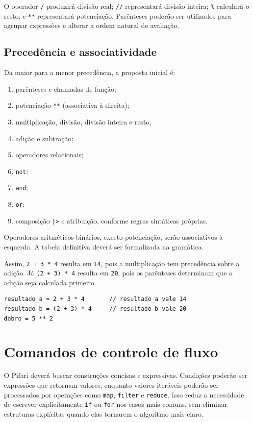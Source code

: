 \documentclass[12pt,a4paper]{article}
\begin{document}
O operador \texttt{/} produzirá divisão real; \texttt{//} representará divisão inteira; \texttt{\%} calculará o resto; e \texttt{**} representará potenciação. Parênteses poderão ser utilizados para agrupar expressões e alterar a ordem natural de avaliação.

\subsection{Precedência e associatividade}
Da maior para a menor precedência, a proposta inicial é:
\begin{enumerate}
\item parênteses e chamadas de função;
\item potenciação \texttt{**} (associativa à direita);
\item multiplicação, divisão, divisão inteira e resto;
\item adição e subtração;
\item operadores relacionais;
\item \texttt{not};
\item \texttt{and};
\item \texttt{or};
\item composição \texttt{|>} e atribuição, conforme regras sintáticas próprias.
\end{enumerate}
Operadores aritméticos binários, exceto potenciação, serão associativos à esquerda. A tabela definitiva deverá ser formalizada na gramática.

Assim, \texttt{2 + 3 * 4} resulta em \texttt{14}, pois a multiplicação tem precedência sobre a adição. Já \texttt{(2 + 3) * 4} resulta em \texttt{20}, pois os parênteses determinam que a adição seja calculada primeiro.

\begin{lstlisting}
resultado_a = 2 + 3 * 4       // resultado_a vale 14
resultado_b = (2 + 3) * 4     // resultado_b vale 20
dobro = 5 ** 2
\end{lstlisting}

\section{Comandos de controle de fluxo}
O Pifari deverá buscar construções concisas e expressivas. Condições poderão ser expressões que retornam valores, enquanto valores iteráveis poderão ser processados por operações como \texttt{map}, \texttt{filter} e \texttt{reduce}. Isso reduz a necessidade de escrever explicitamente \texttt{if} ou \texttt{for} nos casos mais comuns, sem eliminar estruturas explícitas quando elas tornarem o algoritmo mais claro.
\end{document}
